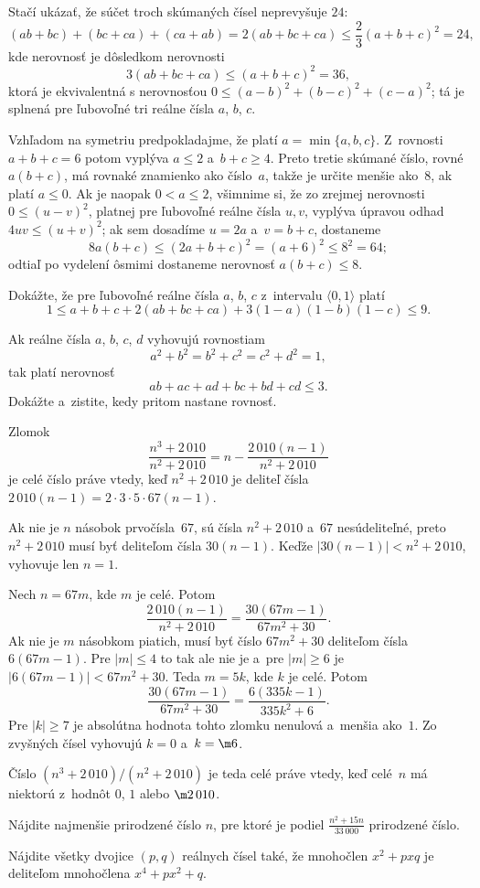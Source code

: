 {%
Stačí ukázať, že súčet troch skúmaných čísel neprevyšuje $24$:
$$
(ab+bc)+(bc+ca)+(ca+ab)=2(ab+bc+ca)\le \frac23(a+b+c)^2=24,
$$
kde nerovnosť je dôsledkom nerovnosti
$$
3(ab+bc+ca) \le (a+b+c)^2=36,
$$
ktorá je ekvivalentná s nerovnosťou $0\le (a-b)^2+(b-c)^2+(c-a)^2$;
tá je splnená pre ľubovoľné tri reálne čísla $a$, $b$, $c$.

\ineriesenie
Vzhľadom na symetriu predpokladajme, že
platí $a=\min\{a,b,c\}$. Z~rovnosti $a+b+c=6$ potom vyplýva
$a\le2$ a~$b+c\ge4$. Preto tretie skúmané číslo,
rovné $a(b+c)$, má rovnaké znamienko ako číslo~$a$, takže je
určite menšie ako~$8$, ak platí $a\le0$. Ak je naopak
$0<a\le2$, všimnime si,
že zo zrejmej nerovnosti $0\le(u-v)^2$, platnej pre
ľubovoľné reálne čísla $u,v$, vyplýva úpravou odhad $4uv\le(u+v)^2$;
ak sem dosadíme $u=2a$ a~$v=b+c$, dostaneme
$$
8a(b+c)\le(2a+b+c)^2=(a+6)^2\le8^2=64;
$$
odtiaľ po vydelení ôsmimi dostaneme nerovnosť $a(b+c)\le8$.

Dokážte, že pre ľubovoľné reálne čísla $a$, $b$, $c$ z~intervalu $\langle
0,1\rangle$ platí
$$
1\le a+b+c+2(ab+bc+ca)+3(1-a)(1-b)(1-c)\le 9.
$$
\vpravo{[55--B--II--4]}

Ak reálne čísla $a$, $b$, $c$, $d$ vyhovujú rovnostiam
$$
a^2+b^2=b^2+c^2=c^2+d^2=1,
$$
tak platí nerovnosť
$$
ab+ac+ad+bc+bd+cd\le 3.
$$
Dokážte a~zistite, kedy pritom nastane rovnosť.
\vpravo{[55--C--II--2]}
}

{%
Zlomok
$$
\frac{n^3+2\,010}{n^2+2\,010}=n-\frac{2\,010(n-1)}{n^2+2\,010}
$$
je celé číslo práve vtedy, keď $n^2+2\,010$ je deliteľ čísla $2\,010(n-1)=2\cdot3\cdot5\cdot67(n-1)$.

Ak nie je $n$ násobok prvočísla~$67$, sú čísla $n^2+2\,010$ a~$67$ nesúdeliteľné,
preto ${n^2+2\,010}$ musí byť deliteľom čísla
$30(n-1)$. Keďže $|30(n-1)|<n^2+2\,010$, vyhovuje len $n=1$.

Nech $n=67m$, kde $m$ je celé. Potom
$$
\frac{2\,010(n-1)}{n^2+2\,010}=\frac {30(67m-1)}{67m^2+30}.
$$
Ak nie je $m$ násobkom piatich, musí byť číslo $67m^2+30$ deliteľom čísla $6(67m-1)$. Pre $|m|\le 4$
to tak ale nie je a~pre $|m|\ge 6$ je
$|6(67m-1)|<67m^2+30$. Teda $m=5k$, kde $k$ je celé. Potom
$$
\frac{30(67m-1)}{67m^2+30}=\frac {6(335k-1)}{335k^2+6}.
$$
Pre $|k|\ge 7$ je absolútna hodnota tohto zlomku nenulová a~menšia ako~$1$.
Zo zvyšných čísel vyhovujú $k=0$ a~$k=\m6$.

Číslo $(n^3+2\,010)/(n^2+2\,010)$ je teda celé práve vtedy, keď celé~$n$
má niektorú z~hodnôt $0$, $1$ alebo $\m2\,010$.

Nájdite najmenšie prirodzené číslo $n$, pre ktoré je podiel
$\frac{n^2+15n}{33\,000}$ prirodzené číslo.
\vpravo{[56--B--S--3]}

Nájdite všetky dvojice $(p,q)$ reálnych čísel také, že mnohočlen
$x^2+pxq$ je deliteľom mnohočlena $x^4+px^2+q$.
\vpravo{[56--B--I--5]}
}

